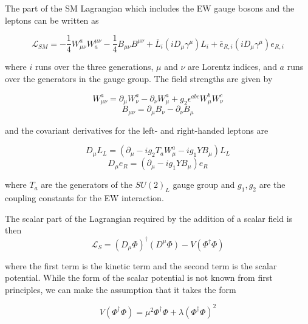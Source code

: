 The part of the SM Lagrangian which includes the EW gauge bosons and the leptons can be written as

	\begin{equation}
	\mathcal{L}_{SM} = -\frac{1}{4}W_{\mu\nu}^{a}W_{a}^{\mu\nu} - \frac{1}{4}B_{\mu\nu}B^{\mu\nu} + \bar{L}_{i}(iD_{\mu}\gamma^{\mu})L_{i} + \bar{e}_{R,i}(iD_{\mu}\gamma^{\mu})e_{R,i}
	\end{equation}

where $i$ runs over the three generations, $\mu$ and $\nu$ are Lorentz indices, and $a$ runs over the generators in the gauge group. The field strengths are given by

	\begin{equation}
	W_{\mu\nu}^{a} = \partial_{\mu}W_{\nu}^{a} - \partial_{\nu}W_{\mu}^{a} + g_{2}\epsilon^{abc}W_{\mu}^{b}W_{\nu}^{c}
	\end{equation}
	\begin{equation}
	B_{\mu\nu} = \partial_{\mu}B_{\nu} - \partial_{\nu}B_{\mu}
	\end{equation}

	and the covariant derivatives for the left- and right-handed leptons are

	\begin{equation}
	D_{\mu}L_{L} = (\partial_{\mu}- ig_{2}T_{a}W_{\mu}^{a}-ig_{1}YB_{\mu})L_{L}
	\end{equation}
	\begin{equation}
	D_{\mu}e_{R} = (\partial_{\mu}- ig_{1}YB_{\mu})e_{R}
	\end{equation}

	where $T_{a}$ are the generators of the $SU(2)_{L}$ gauge group and $g_{1},g_{2}$ are the coupling constants for the EW interaction.

	The scalar part of the Lagrangian required by the addition of a scalar field is then
		\begin{equation}
			\mathcal{L}_{S} = (D_{\mu}\Phi)^{\dagger}(D^{\mu}\Phi) - V(\Phi^{\dagger}\Phi)
		\end{equation}

	where the first term is the kinetic term and the second term is the scalar potential. While the form of the scalar potential is not known from first principles, we can make the assumption that it takes the form 

		\begin{equation}
		V(\Phi^{\dagger}\Phi) = \mu^{2}\Phi^{\dagger}\Phi+\lambda(\Phi^{\dagger}\Phi)^{2}
		\end{equation}

